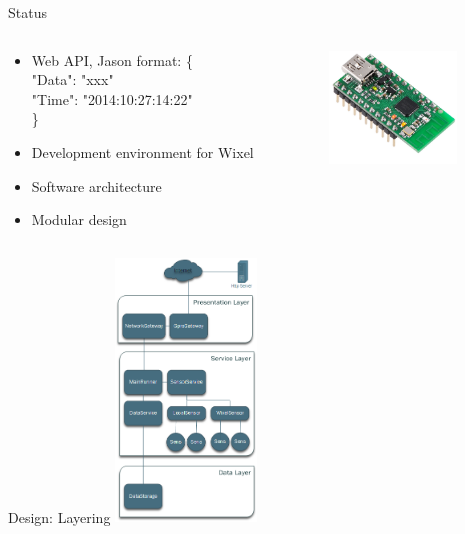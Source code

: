 \documentclass{beamer}
\begin{document}
\begin{frame}{Status}
\begin{columns}[T] %
     \begin{column}[T]{6cm} %
		\begin{itemize}
		\item Web API, Jason format:
			\{\\
				"Data": "xxx"\\
				"Time": "2014:10:27:14:22"\\
			\}
		\item Development environment for Wixel
		\item Software architecture
		\item Modular design
		\end{itemize}
	\end{column}
     \begin{column}[T]{4cm} %
          \includegraphics[height=3cm]{graphics/wixel.png}
          \cite{wixel}
     \end{column}
     \end{columns}
\end{frame}

\begin{frame}{Design: Layering}
\centering
\includegraphics[height=7cm]{graphics/Layering.png}
\end{frame}
\end{document}
